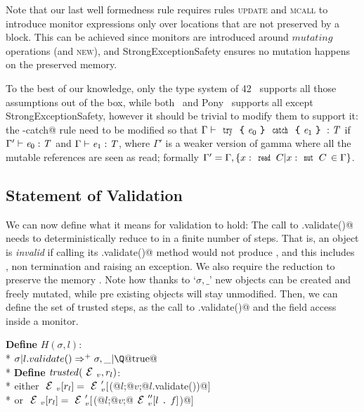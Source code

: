 
Note that our last well formedness rule requires 
rules \textsc{update} and \textsc{mcall} to introduce
monitor expressions only over locations
that are not preserved by a \Q@try@ block.
This can be achieved since monitors are introduced
around $\mathit{mutating}$ operations
(and \textsc{new}),
and StrongExceptionSafety ensures no mutation happens on the preserved memory.

To the best of our knowledge, only the type system of 42~\cite{ServettoEtAl13a,ServettoZucca15}
 supports all those assumptions out of the box,
while both~\cite{GordonEtAl12} and Pony~\cite{clebsch2015deny} supports all except StrongExceptionSafety,
however it should be trivial to modify them to support it:
the \Q@try-catch@ rule need to be modified so that
$\Gamma\vdash\Kw{try}\oC\e_0\cC\Kw{catch}\oC\e_1\cC:\T$
if $\Gamma'\vdash\e_0:\T$ and $\Gamma\vdash\e_1:\T$,
where $\Gamma'$ is a weaker version of gamma where all the mutable
references are seen as read; formally $\Gamma'=\Gamma,\{x:\Kw{read}\,C | x:\Kw{mut}\,C\,\in\Gamma\}$.

\subsection{Statement of Validation}

\noindent We can now define what it means for validation to hold:
The call to \Q@.validate()@ needs to deterministically reduce to \Q@true@ in a finite number
of steps. 
That is, an object is \emph{invalid} if calling its \Q@.validate()@
method would not produce \Q@true@, and this includes \Q@false@, non termination and raising an exception.
We also require the reduction to preserve the memory \Q@sigma@.
Note how thanks to `$\sigma,\_ $' new objects can be created and freely mutated, while 
pre existing objects will stay unmodified.
Then, we can define the set of trusted steps, 
as the call to \Q@.validate()@ and the field access inside a monitor.

\noindent\textbf{Define} $H(\sigma,l)$:\\*
${}_{}$\quad\quad$\sigma | l.validate()\Rightarrow^+ \sigma,\_ | \text{\Q@true@}$\\*
\noindent\textbf{Define} $\mathit{trusted}(\ctx_v,r_l)$:\\*
${}_{}$\quad\quad either $\ctx_v[r_l]=\ctx_v'[$\Q@M(@$l$\Q@;@$v$\Q@;@$l$\Q@.validate())@$]$\\*
${}_{}$\quad\quad or $\ctx_v[r_l]=\ctx_v'[$\Q@M(@$l$\Q@;@$v$\Q@;@$\ctx_v''[l\singleDot\f]$\Q@)@$]$

